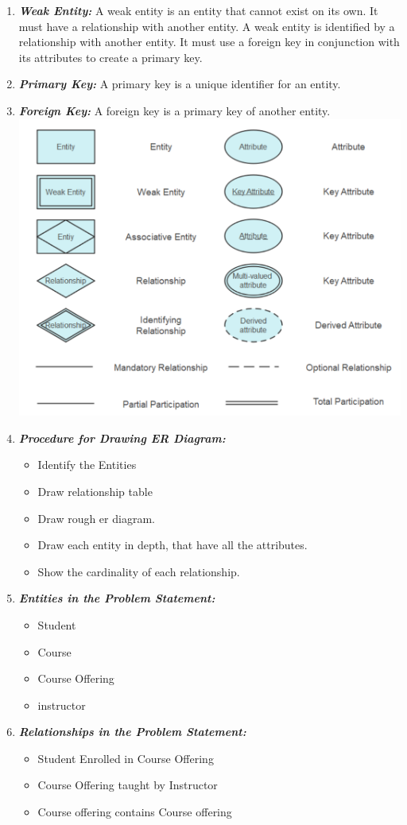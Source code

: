 \documentclass{article}
\begin{document}
\begin{enumerate}
	\item \textbf{\textit{Weak Entity:}} A weak entity is an entity that cannot exist on its own. It must have a relationship with another entity. A weak entity is identified by a relationship with another entity. It must use a foreign key in conjunction with its attributes to create a primary key.
	\item \textbf{\textit{Primary Key:}} A primary key is a unique identifier for an entity.
	\item \textbf{\textit{Foreign Key:}} A foreign key is a primary key of another entity.\\
	\includegraphics[width=5in]{dbms.png}
	\item \textbf{\textit{Procedure for Drawing ER Diagram:}} 
	\begin{itemize}
		\item Identify the Entities
		\item Draw relationship table
		\item Draw rough er diagram.
		\item Draw each entity in depth, that have all the attributes.
		\item Show the cardinality of each relationship.
	\end{itemize}
	\item \textbf{\textit{Entities in the Problem Statement:}}
	\begin{itemize}
		\item Student
		\item Course
		\item Course Offering
		\item instructor
	\end{itemize}
	\item \textbf{\textit{Relationships in the Problem Statement:}}
	\begin{itemize}
		\item Student Enrolled in Course Offering
		\item Course Offering taught by Instructor
		\item Course offering contains Course offering
	\end{itemize}
\end{enumerate}
\end{document}
